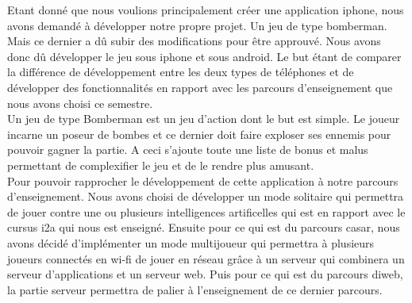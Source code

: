 
 Etant donné que nous voulions principalement créer une application
 \gls{iphone}, nous avons demandé à développer notre propre projet. Un jeu de
 type bomberman. Mais ce dernier a dû subir des modifications pour être
 approuvé. Nous avons donc dû développer le jeu sous \gls{iphone} et sous
 \gls{android}. Le but étant de comparer la différence de développement entre
 les deux types de téléphones et de développer des fonctionnalités en rapport
 avec les parcours d'enseignement que nous avons choisi ce semestre.\\
	
Un jeu de type Bomberman est un jeu d'action dont le but est simple. Le joueur
incarne un poseur de bombes et ce dernier doit faire exploser ses ennemis pour
pouvoir gagner la partie. A ceci s'ajoute toute une liste de bonus et malus
permettant de complexifier le jeu et de le rendre plus amusant.\\
	
Pour pouvoir rapprocher le développement de cette application à notre parcours
d'enseignement. Nous avons choisi de développer un mode solitaire qui permettra
de jouer contre une ou plusieurs intelligences artificelles qui est en rapport
avec le cursus \gls{i2a} qui nous est enseigné. Ensuite pour ce qui est du
parcours \gls{casar}, nous avons décidé d'implémenter un mode multijoueur qui
permettra à plusieurs joueurs connectés en \gls{wi-fi} de jouer en réseau grâce
à un serveur qui combinera un serveur d'applications et un serveur web. Puis
pour ce qui est du parcours \gls{diweb}, la partie serveur permettra de palier à
l'enseignement de ce dernier parcours.
	
